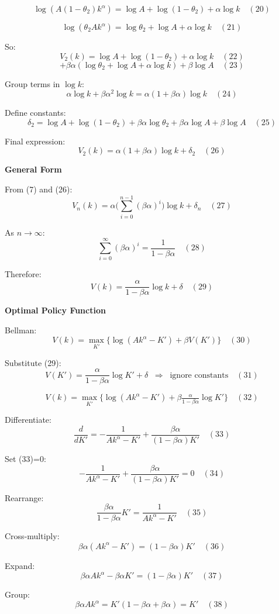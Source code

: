 \documentclass[12pt]{article}
\begin{document}
\[
\log(A(1-\theta_2)k^{\alpha})=\log A+\log(1-\theta_2)+\alpha\log k \quad (20)
\]

\[
\log(\theta_2 Ak^{\alpha})=\log \theta_2+\log A+\alpha\log k \quad (21)
\]

So:
\[
V_2(k)=\log A+\log(1-\theta_2)+\alpha\log k \quad (22)
\]
\[
+ \beta\alpha(\log \theta_2+\log A+\alpha\log k)+\beta\log A \quad (23)
\]

Group terms in \(\log k\):
\[
\alpha\log k+\beta\alpha^2\log k=\alpha(1+\beta\alpha)\log k \quad (24)
\]

Define constants:
\[
\delta_2=\log A+\log(1-\theta_2)+\beta\alpha\log \theta_2+\beta\alpha\log A+\beta\log A \quad (25)
\]

Final expression:
\[
V_2(k)=\alpha(1+\beta\alpha)\log k+\delta_2 \quad (26)
\]

\textbf{General Form}

From (7) and (26):
\[
V_n(k)=\alpha\Big(\sum_{i=0}^{n-1}(\beta\alpha)^i\Big)\log k+\delta_n \quad (27)
\]

As \(n\to\infty\):
\[
\sum_{i=0}^{\infty}(\beta\alpha)^i=\frac{1}{1-\beta\alpha} \quad (28)
\]

Therefore:
\[
V(k)=\frac{\alpha}{1-\beta\alpha}\log k+\delta \quad (29)
\]

\textbf{Optimal Policy Function}

Bellman:
\[
V(k)=\max_{K'}\{\log(Ak^{\alpha}-K')+\beta V(K')\} \quad (30)
\]

Substitute (29):
\[
V(K')=\frac{\alpha}{1-\beta\alpha}\log K'+\delta \;\;\Rightarrow\;\; \text{ignore constants} \quad (31)
\]

\[
V(k)=\max_{K'}\{\log(Ak^{\alpha}-K')+\beta \tfrac{\alpha}{1-\beta\alpha}\log K'\} \quad (32)
\]

Differentiate:
\[
\frac{d}{dK'}=-\frac{1}{Ak^{\alpha}-K'}+\frac{\beta\alpha}{(1-\beta\alpha)K'} \quad (33)
\]

Set (33)=0:
\[
-\frac{1}{Ak^{\alpha}-K'}+\frac{\beta\alpha}{(1-\beta\alpha)K'}=0 \quad (34)
\]

Rearrange:
\[
\frac{\beta\alpha}{1-\beta\alpha}K'=\frac{1}{Ak^{\alpha}-K'} \quad (35)
\]

Cross-multiply:
\[
\beta\alpha(Ak^{\alpha}-K')=(1-\beta\alpha)K' \quad (36)
\]

Expand:
\[
\beta\alpha Ak^{\alpha}-\beta\alpha K'=(1-\beta\alpha)K' \quad (37)
\]

Group:
\[
\beta\alpha Ak^{\alpha}=K'(1-\beta\alpha+\beta\alpha)=K' \quad (38)
\]
\end{document}
